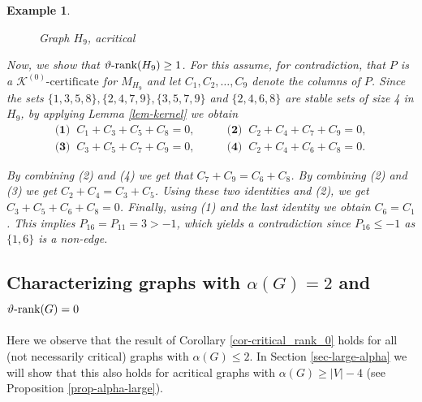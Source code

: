 \documentclass[11pt]{article}
\newtheorem{example}[theorem]{Example}
\newcommand{\kzeroc}{\MK^{(0)}\text{-certificate}}
\numberwithin{equation}{section}
\newcommand{\MK}{{\mathcal K}}
\newcommand{\rrank}{\vartheta\text{\rm -rank}}
\begin{document}
\begin{example}
\begin{figure}[H]
\begin{center}
\end{center}
\caption{Graph $H_9$, acritical}\label{figH9}
\end{figure}

 Now, we show that $\rrank(H_9)\geq 1$. For this assume, for contradiction, that $P$ is a $\kzeroc$ for $M_{H_9}$ and let $C_1,C_2, \dots, C_9$ denote the columns of $P$. Since the sets $\{1,3,5,8\}, \{2,4,7,9\}, \{3,5,7,9\}$ and $\{2,4,6,8\}$ are stable sets of size 4 in $H_9$, by applying Lemma \ref{lem-kernel} we obtain
 \begin{align*}
 \textbf{(1) } \ C_1 + C_3 + C_5 +C_8 = 0, \quad\quad & \textbf{(2) } \ C_2 +C_4 +C_7 +C_9 =0, \\
 \textbf{(3) }\  C_3 +C_5 +C_7 +C_9 = 0 ,\quad\quad & \textbf{(4) }\ C_2 +C_4 +C_6 +C_8 =0 .\end{align*}

 By combining (2) and (4) we get that $C_7 +C_9 = C_6+C_8$. By combining (2) and (3) we get $C_2+C_4 =C_3+C_5$. Using these two identities and (2), we get $C_3 +C_5 +C_6 +C_8=0$. Finally, using (1) and the last identity we obtain  $C_6= C_1$. This implies $P_{16}=P_{11}=3>-1$, which yields a contradiction since %
 $P_{16}\le -1$ as $\{1,6\}$ is a non-edge.
 \end{example}
 
\subsection{Characterizing graphs with $\alpha(G)=2$ and $\rrank(G)=0$}\label{secalpha2}
Here we observe that the  result of Corollary \ref{cor-critical_rank_0}  holds   for all (not necessarily critical) graphs with  $\alpha(G)\le 2$.
In Section \ref{sec-large-alpha} we will show that this %
also  holds  for  acritical graphs with %
 $\alpha(G)\ge |V| -4$
(see Proposition \ref{prop-alpha-large}).
\end{document}
